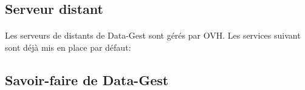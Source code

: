 \subsection{Serveur distant}
\paragraph{}
Les serveurs de distants de Data-Gest sont gérés par OVH. Les services suivant sont déjà mis en place par défaut: 

%
%
%
%
%

\subsection{Savoir-faire de Data-Gest}
